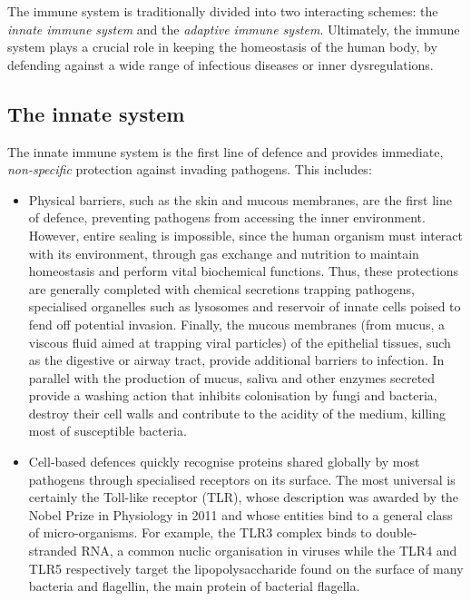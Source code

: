 The immune system is traditionally divided into two interacting schemes: the \textit{innate immune system} and the \textit{adaptive immune system}. 
Ultimately, the immune system plays a crucial role in keeping the homeostasis of the human body, by defending against a wide range of infectious diseases or inner dysregulations. 

\subsection{The innate system}
\label{subsec:innate-system}
The innate immune system is the first line of defence and provides immediate, \textit{non-specific} protection against invading pathogens.  This includes:
\begin{itemize}
    \item[Barrier defences] Physical barriers, such as the skin and mucous membranes, are the first line of defence, preventing pathogens from accessing the inner environment. However, entire sealing is impossible, since the human organism must interact with its environment, through gas exchange and nutrition to maintain homeostasis and perform vital biochemical functions. Thus, these protections are generally completed with chemical secretions trapping pathogens, specialised organelles such as lysosomes and reservoir of innate cells poised to fend off potential invasion. Finally, the mucous membranes (from mucus, a viscous fluid aimed at trapping viral particles) of the \gls{epithelial} tissues, such as the digestive or airway tract, provide additional barriers to infection. In parallel with the production of mucus, saliva and other enzymes secreted provide a washing action that inhibits colonisation by fungi and bacteria, destroy their cell walls and contribute to the acidity of the medium, killing most of susceptible bacteria.  
    
    \item[Immune cells] Cell-based defences quickly recognise proteins shared globally by most pathogens through specialised receptors on its surface. The most universal is certainly the Toll-like receptor (TLR), whose description was awarded by the Nobel Prize in Physiology in 2011 and whose entities bind to a general class of micro-organisms. For example, the TLR3 complex
binds to double-stranded RNA, a common nuclic organisation in viruses while the TLR4 and TLR5 respectively target the lipopolysaccharide found on the surface of many bacteria and flagellin, the main protein of bacterial flagella. 


\end{itemize}
